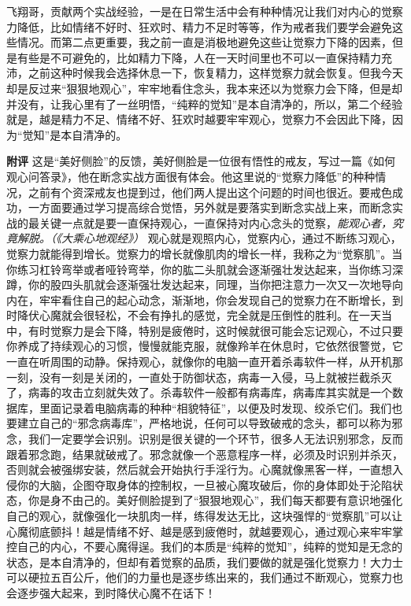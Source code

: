 \begin{case}
\end{case}

\begin{case}
    飞翔哥，贡献两个实战经验，一是在日常生活中会有种种情况让我们对内心的觉察力降低，比如情绪不好时、狂欢时、精力不足时等等，作为戒者我们要学会避免这些情况。而第二点更重要，我之前一直是消极地避免这些让觉察力下降的因素，但是有些是不可避免的，比如精力下降，人在一天时间里也不可以一直保持精力充沛，之前这种时候我会选择休息一下，恢复精力，这样觉察力就会恢复。但我今天却是反过来“狠狠地观心”，牢牢地看住念头，我本来还以为觉察力会下降，但是却并没有，让我心里有了一丝明悟，“纯粹的觉知”是本自清净的，所以，第二个经验就是，越是精力不足、情绪不好、狂欢时越要牢牢观心，觉察力不会因此下降，因为“觉知”是本自清净的。

    \textbf{附评} 这是“美好侧脸”的反馈，美好侧脸是一位很有悟性的戒友，写过一篇《如何观心问答录》，他在断念实战方面很有体会。他这里说的“觉察力降低”的种种情况，之前有个资深戒友也提到过，他们两人提出这个问题的时间也很近。要戒色成功，一方面要通过学习提高综合觉悟，另外就是要落实到断念实战上来，而断念实战的最关键一点就是要一直保持观心，一直保持对内心念头的觉察，\textit{能观心者，究竟解脱。（《大乘心地观经》）} 观心就是观照内心，觉察内心，通过不断练习观心，觉察力就能得到增长。觉察力的增长就像肌肉的增长一样，我称之为“觉察肌”。当你练习杠铃弯举或者哑铃弯举，你的肱二头肌就会逐渐强壮发达起来，当你练习深蹲，你的股四头肌就会逐渐强壮发达起来，同理，当你把注意力一次又一次地导向内在，牢牢看住自己的起心动念，渐渐地，你会发现自己的觉察力在不断增长，到时降伏心魔就会很轻松，不会有挣扎的感觉，完全就是压倒性的胜利。在一天当中，有时觉察力是会下降，特别是疲倦时，这时候就很可能会忘记观心，不过只要你养成了持续观心的习惯，慢慢就能克服，就像羚羊在休息时，它依然很警觉，它一直在听周围的动静。保持观心，就像你的电脑一直开着杀毒软件一样，从开机那一刻，没有一刻是关闭的，一直处于防御状态，病毒一入侵，马上就被拦截杀灭了，病毒的攻击立刻就失效了。杀毒软件一般都有病毒库，病毒库其实就是一个数据库，里面记录着电脑病毒的种种“相貌特征”，以便及时发现、绞杀它们。我们也要建立自己的“邪念病毒库”，严格地说，任何可以导致破戒的念头，都可以称为邪念，我们一定要学会识别。识别是很关键的一个环节，很多人无法识别邪念，反而跟着邪念跑，结果就破戒了。邪念就像一个恶意程序一样，必须及时识别并杀灭，否则就会被强绑安装，然后就会开始执行手淫行为。心魔就像黑客一样，一直想入侵你的大脑，企图夺取身体的控制权，一旦被心魔攻破后，你的身体即处于沦陷状态，你是身不由己的。美好侧脸提到了“狠狠地观心”，我们每天都要有意识地强化自己的观心，就像强化一块肌肉一样，练得发达无比，这块强悍的“觉察肌”可以让心魔彻底颤抖！越是情绪不好、越是感到疲倦时，就越要观心，通过观心来牢牢掌控自己的内心，不要心魔得逞。我们的本质是“纯粹的觉知”，纯粹的觉知是无念的状态，是本自清净的，但却有着觉察的品质，我们要做的就是强化觉察力！大力士可以硬拉五百公斤，他们的力量也是逐步练出来的，我们通过不断观心，觉察力也会逐步强大起来，到时降伏心魔不在话下！
\end{case}

